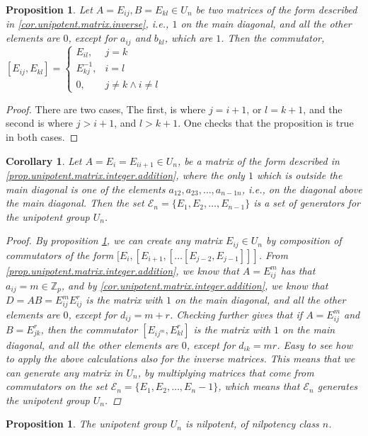 \documentclass[12pt]{article}
\newtheorem{proposition}[theorem]{Proposition}
\newtheorem{corollary}[theorem]{Corollary}
\begin{document}
\begin{proposition}
\label{prop.commutators}
Let $A=E_{ij},B=E_{kl}\in U_n$ be two matrices of the form described in \ref{cor.unipotent.matrix.inverse}, i.e., $1$ on the main diagonal, and all the other elements are $0$, except for $a_{ij}$ and $b_{kl}$, which are $1$. Then the commutator, $[E_{ij},E_{kl}] =
\left\{
	\begin{array}{ll}
		E_{il}, & j=k\\
        E_{kj}^{-1}, & i=l\\
        0, & j\neq k\land i\neq l
	\end{array}
\right.$
\end{proposition}
\begin{proof}
There are two cases, The first, is where $j=i+1$, or $l=k+1$, and the second is where $j>i+1$, and $l>k+1$. One checks that the proposition is true in both cases.
\end{proof}
\begin{corollary}
\label{cor.unipotent.generators}
Let $A=E_i=E_{ii+1}\in U_n$, be a matrix of the form described in \ref{prop.unipotent.matrix.integer.addition}, where the only $1$ which is outside the main diagonal is one of the elements $a_{12},a_{23},\dots,a_{n-1n}$, i.e., on the diagonal above the main diagonal. Then the set $\mathcal{E}_n=\{E_1,E_2,\dots,E_{n-1}\}$ is a set of generators for the unipotent group $U_n$.
\begin{proof}
By proposition \ref{prop.commutators}, we can create any matrix $E_{ij}\in U_n$ by composition of commutators of the form $[E_i,[E_{i+1},[\dots[E_{j-2},E_{j-1}]]]$. From \ref{prop.unipotent.matrix.integer.addition}, we know that $A=E_{ij}^m$ has that $a_{ij}=m\in\mathbb{Z}_p$, and by \ref{cor.unipotent.matrix.integer.addition}, we know that $D=AB=E_{ij}^mE_{ij}^r$ is the matrix with $1$ on the main diagonal, and all the other elements are $0$, except for $d_{ij}=m+r$. Checking further gives that if $A=E_{ij}^m$ and $B=E_{jk}^r$, then the commutator $[E_{ij^m},E_{kl}^r]$ is the matrix with $1$ on the main diagonal, and all the other elements are $0$, except for $d_{ik}=mr$. Easy to see how to apply the above calculations also for the inverse matrices. This means that we can generate any matrix in $U_n$, by multiplying matrices that come from commutators on the set $\mathcal{E}_n=\{E_1,E_2,\dots,E_n-1\}$, which means that $\mathcal{E}_n$ generates the unipotent group $U_n$.
\end{proof}
\end{corollary}
\begin{proposition}
\label{prop.unipotent.group.nilpotent}
The unipotent group $U_n$ is nilpotent, of nilpotency class $n$.
\end{proposition}
\end{document}
